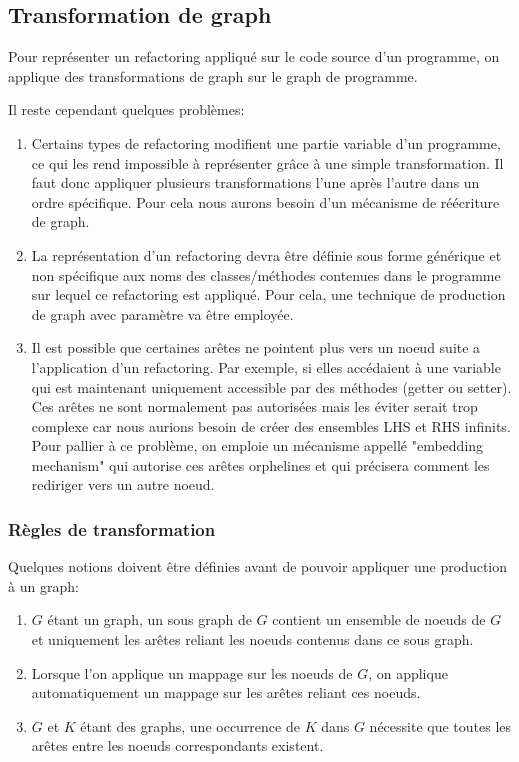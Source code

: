 \documentclass[a4paper, 12pt]{article}
\begin{document}
  \subsection{Transformation de graph}

  Pour représenter un refactoring appliqué sur le code source d'un programme, on applique des transformations de graph sur le graph de programme.

  Il reste cependant quelques problèmes:

  \begin{enumerate}
    \item Certains types de refactoring modifient une partie variable d'un programme, ce qui les rend impossible à représenter grâce à une simple transformation.
    Il faut donc appliquer plusieurs transformations l'une après l'autre dans un ordre spécifique. Pour cela nous aurons besoin d'un mécanisme de réécriture de graph.

    \item La représentation d'un refactoring devra être définie sous forme générique et non spécifique aux noms des classes/méthodes contenues dans le programme sur lequel ce refactoring est appliqué.
    Pour cela, une technique de production de graph avec paramètre va être employée.

    \item Il est possible que certaines arêtes ne pointent plus vers un noeud suite a l'application d'un refactoring.
    Par exemple, si elles accédaient à une variable qui est maintenant uniquement accessible par des méthodes (getter ou setter).
    Ces arêtes ne sont normalement pas autorisées mais les éviter serait trop complexe car nous aurions besoin de créer des ensembles LHS et RHS infinits.
    Pour pallier à ce problème, on emploie un mécanisme appellé "embedding mechanism" qui autorise ces arêtes orphelines et qui précisera comment les rediriger vers un autre noeud.

  \end{enumerate}

  \subsubsection{Règles de transformation}

  Quelques notions doivent être définies avant de pouvoir appliquer une production à un graph:

  \begin{enumerate}
    \item \(G\) étant un graph, un sous graph de \(G\) contient un ensemble de noeuds de \(G\) et uniquement les arêtes reliant les noeuds contenus dans ce sous graph.

    \item Lorsque l'on applique un mappage sur les noeuds de \(G\), on applique automatiquement un mappage sur les arêtes reliant ces noeuds.

    \item \(G\) et \(K\) étant des graphs, une occurrence de \(K\) dans \(G\) nécessite que toutes les arêtes entre les noeuds correspondants existent.

  \end{enumerate}
\end{document}
